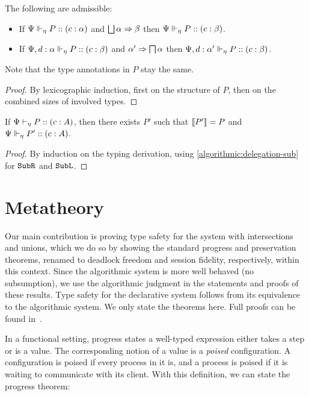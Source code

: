 \documentclass[submission,copyright,creativecommons]{eptcs}
\begin{document}
\begin{lemma}
  \label{algorithmic:delegation-sub}
  The following are admissible:
  \begin{itemize}
    \item If ${\Psi} \Vdash_{\eta} P :: (c : \alpha)$ and $\operatorname{\bigsqcup}\alpha \Rightarrow \beta$ then ${\Psi} \Vdash_{\eta} P :: (c : \beta)$.
    \item If ${\Psi, d : \alpha} \Vdash_{\eta} P :: (c : \beta)$ and $\alpha' \Rightarrow \operatorname{\bigsqcap}\alpha$ then ${\Psi, d : \alpha'} \Vdash_{\eta} P :: (c : \beta)$.
  \end{itemize}
  Note that the type annotations in $P$ stay the same.
\end{lemma}
\begin{proof}
  By lexicographic induction, first on the structure of $P$, then on the combined sizes of involved types.
\end{proof}

\begin{theorem}
  If ${\Psi} \vdash_{\eta} P :: (c : A)$, then there exists $P'$ such that $\left \llbracket {P'} \right \rrbracket = P$ and ${\Psi} \Vdash_{\eta} P' :: (c : A)$.
\end{theorem}
\begin{proof}
  By induction on the typing derivation, using \cref{algorithmic:delegation-sub} for $\texttt{Sub}\texttt{R}$ and $\texttt{Sub}\texttt{L}$.
\end{proof}


\section{Metatheory}
\label{metatheory}

Our main contribution is proving type safety for the system with intersections and unions, which we do so by showing the standard progress and preservation theorems, renamed to deadlock freedom and session fidelity, respectively, within this context. Since the algorithmic system is more well behaved (no subsumption), we use the algorithmic judgment in the statements and proofs of these results. Type safety for the declarative system follows from its equivalence to the algorithmic system. We only state the theorems here. Full proofs can be found in~\cite{Acay16}.

In a functional setting, progress states a well-typed expression either takes a step or is a value. The corresponding notion of a value is a \emph{poised} configuration. A configuration is poised if every process in it is, and a process is poised if it is waiting to communicate with its client. With this definition, we can state the progress theorem:
\end{document}
